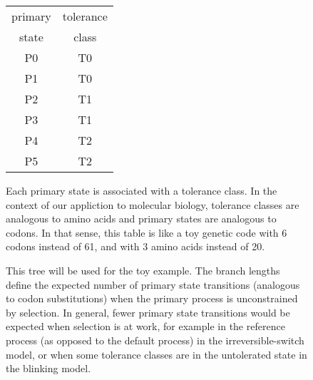 \documentclass{article}
\begin{document}
\begin{figure}
\centering
\begin{tabular}{c c}
  primary & tolerance \\
  state & class \\
  \hline
  P0 & T0 \\
  P1 & T0 \\
  P2 & T1 \\
  P3 & T1 \\
  P4 & T2 \\
  P5 & T2
\end{tabular}
\caption{
	Each primary state is associated with a tolerance class.
	In the context of our appliction to molecular biology,
	tolerance classes are analogous to amino acids
	and primary states are analogous to codons.
	In that sense, this table is like a toy genetic code
	with 6 codons instead of 61,
	and with 3 amino acids instead of 20.
}
\end{figure}

\begin{figure}
\centering
{}
\caption{
	This tree will be used for the toy example.
	The branch lengths define the expected number of
	primary state transitions (analogous to codon substitutions)
	when the primary process is unconstrained by selection.
	In general, fewer primary state transitions would be expected
	when selection is at work, for example in the reference process
	(as opposed to the default process) in the irreversible-switch model,
	or when some tolerance classes are in the untolerated state
	in the blinking model.
}
\end{figure}
\end{document}
